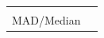 \documentclass[
]{book}
\begin{document}
\begin{longtable}[]{@{}
  >{\raggedright\arraybackslash}p{}
  >{\raggedright\arraybackslash}p{}@{}}
                                                                                                                                                                                                                                                                                                                                                                                                                                                                                                                                                                                                                                                                                                                                                                                                                                                                                                                                                                                                                                                                                                                                                                                                                            \) \\
MAD/Median & \(                                                                                                                                                                                                                                                                                                                                                                                                                                                                                                                                                                                                                                                                                                                                                                                                                                                                                                                                                                                                                                                                                                                                                                                        

\end{longtable}
\end{document}
